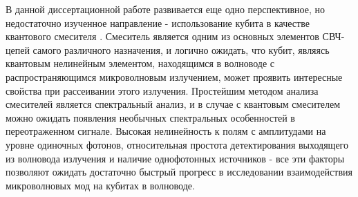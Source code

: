 В данной диссертационной работе развивается еще одно перспективное, но недостаточно изученное направление - использование кубита в качестве квантового смесителя \cite[]{vakbib1,vakbib3,vakbib4}. Смеситель является одним из основных элементов СВЧ-цепей самого различного назначения, и логично ожидать, что кубит, являясь квантовым нелинейным элементом, находящимся в волноводе с распространяющимся микроволновым излучением, может проявить интересные свойства при рассеивании этого излучения. Простейшим методом анализа смесителей является спектральный анализ, и в случае с квантовым смесителем можно ожидать появления необычных спектральных особенностей в переотраженном сигнале.
Высокая нелинейность к полям с амплитудами на уровне одиночных фотонов, относительная простота детектирования выходящего из волновода излучения и наличие однофотонных источников - все эти факторы позволяют ожидать достаточно быстрый прогресс в исследовании взаимодействия микроволновых мод на кубитах в волноводе.